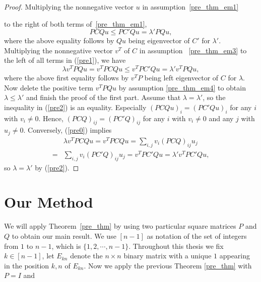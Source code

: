 \documentclass[12pt, a4paper]{article}
\theoremstyle{plain}
\theoremstyle{definition}
\begin{document}
\begin{proof}
    Multiplying the nonnegative vector $u$ in assumption~\ref{pre_thm_em1}
    
    to the right of both terms of~\ref{pre_thm_em1},
    \begin{equation}\label{pre1}
       PCQu\leq PC'Qu=\lambda'PQu,
    \end{equation}
 where the above equality follows by $Qu$ being eigenvector of $C'$ for $\lambda'$.
    Multiplying the nonnegative vector $v^T$ of $C$ in assumption
     ~\ref{pre_thm_em3} to the left of all terms  in (\ref{pre1}), we have
    \begin{equation}\label{pre2}
        \lambda v^TPQu=v^TPCQu\leq v^TPC'Qu=\lambda' v^TPQu,
    \end{equation}
    where the above first equality follows by $v^TP$ being
    left eigenvector of $C$ for $\lambda$.
    Now delete the positive term $v^TPQu$ by assumption \ref{pre_thm_em4} to obtain
        $\lambda\leq \lambda'$ and finish the proof of the first part.
        Assume that $\lambda=\lambda'$, so the inequality in (\ref{pre2}) is an equality.
        Especially $(PCQu)_i=(PC'Qu)_i$ for any $i$ with $v_i\not=0.$ Hence,
        $(PCQ)_{ij}=(PC'Q)_{ij}$ for any $i$ with $v_i\not=0$ and any $j$ with
        $u_j\not=0.$ Conversely, (\ref{pre0}) implies
        \begin{align*} &\lambda v^TPCQu=v^TPCQu=\sum_{i,j} v_i(PCQ)_{ij}u_j\\ =&
         \sum_{i,j} v_i(PC'Q)_{ij}u_j=v^TPC'Qu=\lambda'v^TPC'Qu,
         \end{align*} so $\lambda=\lambda'$ by (\ref{pre2}).
\end{proof}

\section{Our Method}

We will apply Theorem~\ref{pre_thm} by using two particular square matrices $P$ and $Q$ to obtain our main result. 
We use $[n-1]$ as notation of the set of integers from $1$ to $n-1$, which is $\{1,2,\cdots,n-1\}$.
Throughout this thesis we fix $k\in [n-1]$, let $E_{kn}$ denote the $n\times n$ binary matrix with a unique $1$
appearing in the position $k,n$ of $E_{kn}$. Now we apply the previous Theorem \ref{pre_thm} with $P=I$ and
\end{document}
